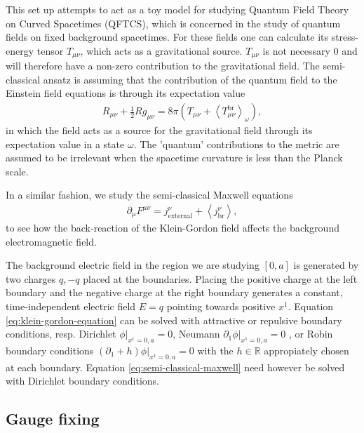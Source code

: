 This set up attempts to act as a toy model for studying Quantum Field Theory on Curved Spacetimes (QFTCS), which is concerned in the study of quantum fields on fixed background spacetimes. For these fields one can calculate its stress-energy tensor $T_{\mu\nu}$, which acts as a gravitational source.  $T_{\mu\nu}$ is not necessary 0 and will therefore have a non-zero contribution to the gravitational field. The semi-classical ansatz is assuming that the contribution of the quantum field to the Einstein field equations is through its expectation value
\begin{align}
R_{\mu\nu} + \frac{1}{2}Rg_{\mu\nu} = 8\pi \left( T_{\mu\nu} + \left<T_{\mu\nu}^\text{br} \right>_\omega \right),
\end{align}
in which the field acts as a source for the gravitational field through its expectation value in a state $\omega$. The 'quantum' contributions to the metric are assumed to be irrelevant when the spacetime curvature is less than the Planck scale.

In a similar fashion, we study the semi-classical Maxwell equations 
\begin{align}
			\partial_\mu F^{\mu\nu}= j_{\text{external}}^{\nu} + \left<j_\text{br}^{\nu} \right>,
			\label{eq:semi-classical-maxwell}
\end{align}
to see how the back-reaction of the Klein-Gordon field affects the background electromagnetic field. 

The background electric field in the region we are studying $[0, a]$ is generated by two charges $q, -q$ placed at the boundaries. Placing the positive charge at the left boundary and the negative charge at the right boundary generates a constant, time-independent electric field $E=q$ pointing towards positive $x^{1}$.
Equation \eqref{eq:klein-gordon-equation} can be solved with attractive or repulsive boundary conditions, resp. Dirichlet $\left. \phi\right|_{x^1 = 0, a}=0$, Neumann $\left. \partial_{1}\phi\right|_{x^1 = 0, a}=0$ , or Robin boundary conditions $\left.\left( \partial_1 + h\right)\phi  \right|_{x^{1}=0, a}=0$ with the $h\in \mathbb{R}$ appropiately chosen at each boundary. Equation \eqref{eq:semi-classical-maxwell} need however be solved with Dirichlet boundary conditions.

\subsection{Gauge fixing}

